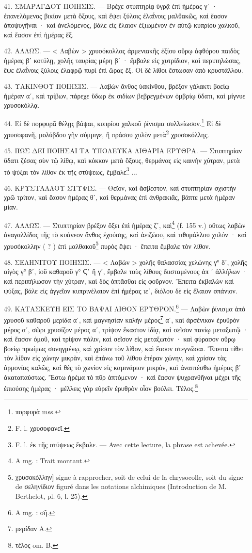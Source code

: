 \documentclass[a4paper, 11pt, oneside, polutonikogreek, french]{article}
\begin{document}
41. ΣΜΑΡΑΓΔΟΥ ΠΟΙΗΣΙΣ. --- Βρέχε στυπτηρίᾳ ὑγρᾷ ἐπὶ ἡμέρας γʹ · ἐπανελόμενος βικίον μετὰ ὄξους, καὶ ἕψει ξύλοις ἐλαΐνοις μαλθακῶς, καὶ ἔασον ἀποψυγῆναι · καὶ ἀνελόμενος, βάλε εἰς ἔλαιον ἐξιωμένον ἐν αὐτῷ κυπρίου χαλκοῦ, καὶ ἔασον ἐπὶ ἡμέρας ἕξ.

42. ΑΛΛΩΣ. --- < Λαβὼν > χρυσόκολλας ἀρμενιακῆς ἐξίου οὔρῳ ἀφθόρου παιδὸς ἡμέρας βʹ κοτύλῃ, χολῆς ταυρίας μέρη βʹ · ἔμβαλε εἰς χυτρίδιον, καὶ περιπηλώσας, ἕψε ἐλαΐνοις ξύλοις ἐλαφρῷ πυρὶ ἐπὶ ὥρας ἕξ. Οἱ δὲ λίθοι ἔστωσαν ἀπὸ κρυστάλλου.

43. ΥΑΚΙΝΘΟΥ ΠΟΙΗΣΙΣ. --- Λαβὼν ἄνθος ὑακίνθου, βρέξον γάλακτι βοείῳ ἡμέραν αʹ, καὶ τρίβων, πάρεχε ὕδωρ ἐκ σιδίων βεβρεγμένων ὀμβρίῳ ὕδατι, καὶ μίγνυε χρυσοκόλλᾳ.

44. Εἰ δὲ πορφυρᾶ θέλῃς βάψαι, κυπρίου χαλκοῦ ῥίνισμα συλλείωσον.\footnote{πορφυρὰ mss.} Εἰ δὲ χρυσοφανῆ, μολύβδου γῆν σύμμιγε, ἢ πράσου χυλὸν μετὰ\footnote{F. l. χρυσοφανεῖ.} χρυσοκόλλης.

45. ΠΩΣ ΔΕΙ ΠΟΙΗΣΑΙ ΤΑ ΥΠΟΛΕΥΚΑ ΛΙΘΑΡΙΑ ΕΡΥΘΡΑ. --- Στυπτηρίαν ὕδατι ζέσας σὺν τῷ λίθῳ, καὶ κόκκον μετὰ ὄξους, θερμάνας εἰς καινὴν χύτραν, μετὰ τὸ ψύξαι τὸν λίθον ἐκ τῆς στύψεως, ἔμβαλε\footnote{F. l. ἐκ τῆς στύψεως ἔκβαλε. --- Avec cette lecture, la phrase est achevée.} ...

46. ΚΡΥΣΤΑΛΛΟΥ ΣΤΥΨΙΣ. --- Θεῖον, καὶ ἄσβεστον, καὶ στυπτηρίαν σχιστὴν χρῶ τρίτον, καὶ ἔασον ἡμέρας θʹ, καὶ θερμάνας ἐπὶ ἀνθρακιᾶς, βάπτε μετὰ ἡμέραν μίαν.

47. ΑΛΛΩΣ. --- Στυπτηρίαν βρέξον ὄξει ἐπὶ ἡμέρας ζʹ, καὶ\footnote{A mg. : Trait montant.} (f. 155 v.) οὕτως λαβὼν ἀναγαλλίδος τῆς τὸ κυάνεον ἄνθος ἐχούσης, καὶ ἀειζώου, καὶ τιθυμάλλου χυλόν · καὶ χρυσόκολλην ( ? ) ἐπὶ μαλθακοῦ\footnote{χρυσοκόλλην] signe à rapprocher, soit de celui de la chrysocolle, soit du signe de σεληνίδιον figuré dans les notations alchimiques (Introduction de M. Berthelot, pl. 6, l. 25).} πυρὸς ἕψει · ἔπειτα ἔμβαλε τὸν λίθον.

48. ΣΕΛΗΝΙΤΟΥ ΠΟΙΗΣΙΣ. --- < Λαβὼν > χολῆς θαλασσίας χελώνης γ° δʹ, χολῆς αἰγὸς γ° βʹ, ἰοῦ καθαροῦ γ° Ϛʹ ἢ γʹ, ἔμβαλε τοὺς λίθους διισταμένους ἀπ ᾽ ἀλλήλων · καὶ περιπήλωσον τὴν χύτραν, καὶ δὸς ὀπτᾶσθαι εἰς φοῦρνον. Ἔπειτα ἐκβαλὼν καὶ ψύξας, βάλε εἰς ἀγγεῖον κυπρινέλαιον ἐπὶ ἡμέρας ιεʹ, διόλου δὲ εἰς ἔλαιον σπάνιον.

49. ΚΑΤΑΣΚΕΥΗ ΕΙΣ ΤΟ ΒΑΨΑΙ ΛΙΘΟΝ ΕΡΥΘΡΟΝ.\footnote{A mg. : σῆ.} --- Λαβὼν ῥίνισμα ἀπὸ χρυσοῦ καθαροῦ μερίδα αʹ, καὶ μαγνησίαν καλὴν μέρος\footnote{μερίδαν A.} αʹ, καὶ ἀρσένικον ἐρυθρὸν μέρος αʹ, σῶρι χρυσίζον μέρος αʹ, τρίψον ἕκαστον ἰδίᾳ, καὶ σεῖσον πανίῳ μεταξωτῷ · καὶ ἔασον ὁμοῦ, καὶ τρίψον πάλιν, καὶ σεῖσον εἰς μεταξωτόν · καὶ φύρασον οὔρῳ βοείῳ πρωίμως συνηγμένῳ, καὶ χρίσον τὸν λίθον, καὶ ἔασον στεγνῶσαι. Ἔπειτα τίθει τὸν λίθον εἰς χώνην μικρὰν, καὶ ἐπάνω τοῦ λίθου ἑτέραν χώνην, καὶ χρίσον τὰς ἁρμονίας καλῶς, καὶ θὲς τὸ χωνίον εἰς καμινάριον μικρὸν, καὶ ἀναπτέσθω ἡμέρας βʹ ἀκαταπαύστως. Ἔστω ἠρέμα τὸ πῦρ ἁπτόμενον · καὶ ἔασον ψυχρανθῆναι μέχρι τῆς ἐπιούσης ἡμέρας · μέλλεις γὰρ εὑρεῖν ἐρυθρὸν οἷον βούλει. Τέλος.\footnote{τέλος om. B.}
\end{document}
